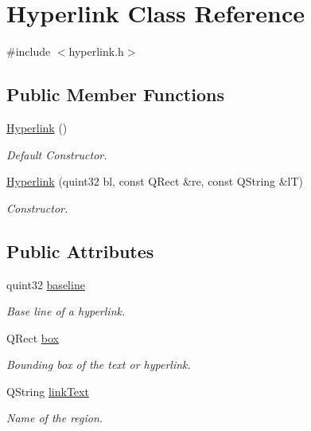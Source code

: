 \hypertarget{classHyperlink}{\section{Hyperlink Class Reference}
\label{classHyperlink}
}


{\ttfamily \#include $<$hyperlink.\+h$>$}

\subsection*{Public Member Functions}
\begin{DoxyCompactItemize}
\item 
\hyperlink{classHyperlink_a54a241958a42b58e8fdb2d532ae16714}{Hyperlink} ()
\begin{DoxyCompactList}\small\item\em Default Constructor. \end{DoxyCompactList}\item 
\hyperlink{classHyperlink_a33d1db529eb90309918e2e6adbaf539a}{Hyperlink} (quint32 bl, const Q\+Rect \&re, const Q\+String \&l\+T)
\begin{DoxyCompactList}\small\item\em Constructor. \end{DoxyCompactList}\end{DoxyCompactItemize}
\subsection*{Public Attributes}
\begin{DoxyCompactItemize}
\item 
quint32 \hyperlink{classHyperlink_aec2a7167f48623f38d3c628e0ebb298f}{baseline}
\begin{DoxyCompactList}\small\item\em Base line of a hyperlink. \end{DoxyCompactList}\item 
Q\+Rect \hyperlink{classHyperlink_ad7a3e8de8ad043dd8bbfb65eb963c72d}{box}
\begin{DoxyCompactList}\small\item\em Bounding box of the text or hyperlink. \end{DoxyCompactList}\item 
Q\+String \hyperlink{classHyperlink_a9aa732893dfb8f1c253132dca07cb052}{link\+Text}
\begin{DoxyCompactList}\small\item\em Name of the region. \end{DoxyCompactList}\end{DoxyCompactItemize}


